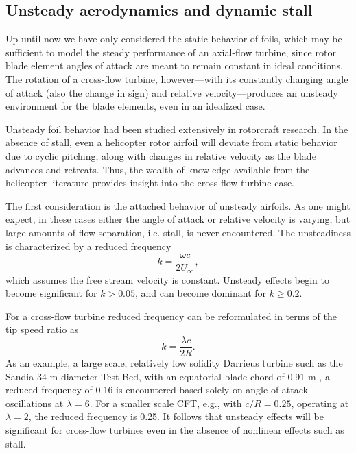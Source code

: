 \subsection{Unsteady aerodynamics and dynamic stall}

Up until now we have only considered the static behavior of foils, which may be
sufficient to model the steady performance of an axial-flow turbine, since rotor
blade element angles of attack are meant to remain constant in ideal conditions.
The rotation of a cross-flow turbine, however---with its constantly changing
angle of attack (also the change in sign) and relative velocity---produces an
unsteady environment for the blade elements, even in an idealized case.

Unsteady foil behavior had been studied extensively in rotorcraft research. In
the absence of stall, even a helicopter rotor airfoil will deviate from static
behavior due to cyclic pitching, along with changes in relative velocity as the
blade advances and retreats. Thus, the wealth of knowledge available from the
helicopter literature provides insight into the cross-flow turbine case.

The first consideration is the attached behavior of unsteady airfoils. As one
might expect, in these cases either the angle of attack or relative velocity is
varying, but large amounts of flow separation, i.e. stall, is never encountered.
The unsteadiness is characterized by a reduced frequency~\cite{Leishman2006}
\begin{equation}
    k = \frac{\omega c}{2 U_\infty},
\end{equation}
which assumes the free stream velocity is constant. Unsteady effects begin to
become significant for $k > 0.05$, and can become dominant for $k \ge 0.2$.

For a cross-flow turbine reduced frequency can be reformulated in terms of the
tip speed ratio as
\begin{equation}
    k = \frac{\lambda c}{2R}.
\end{equation}
As an example, a large scale, relatively low solidity Darrieus turbine such as
the Sandia 34 m diameter Test Bed, with an equatorial blade chord of 0.91 m
\cite{Murray2011}, a reduced frequency of 0.16 is encountered based solely on
angle of attack oscillations at $\lambda=6$. For a smaller scale CFT, e.g., with
$c/R = 0.25$, operating at $\lambda = 2$, the reduced frequency is 0.25. It
follows that unsteady effects will be significant for cross-flow turbines even
in the absence of nonlinear effects such as stall.

